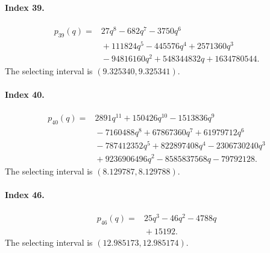 \paragraph{Index 39.}
\begin{align*}
p_{39}(q)={}&27 q^{8} -  682 q^{7} -  3750 q^{6}\\
&{}+ 111824 q^{5} -  445576 q^{4} + 2571360 q^{3}\\
&{}- 94816160 q^{2} + 548344832 q + 1634780544.
\end{align*}
The selecting interval is $(9.325340,9.325341)$.
\paragraph{Index 40.}
\begin{align*}
p_{40}(q)={}&2891 q^{11} + 150426 q^{10} -  1513836 q^{9}\\
&{}- 7160488 q^{8} + 67867360 q^{7} + 61979712 q^{6}\\
&{}- 787412352 q^{5} + 822897408 q^{4} -  2306730240 q^{3}\\
&{}+ 9236906496 q^{2} -  8585837568 q - 79792128.
\end{align*}
The selecting interval is $(8.129787,8.129788)$.
\paragraph{Index 46.}
\begin{align*}
p_{46}(q)={}&25 q^{3} -  46 q^{2} -  4788 q\\
&{}+ 15192.
\end{align*}
The selecting interval is $(12.985173,12.985174)$.
